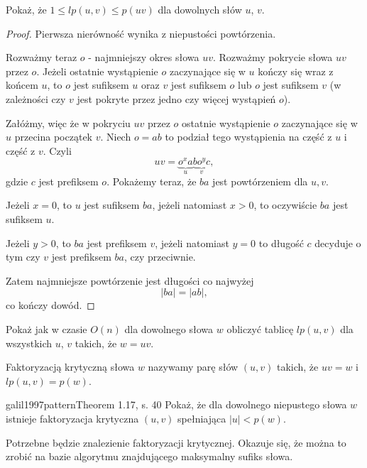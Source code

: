\begin{problem}{}{}
  Pokaż, że $1 \le lp(u, v) \le p(uv)$ dla dowolnych słów $u$, $v$.
\end{problem}

\begin{proof}
Pierwsza nierówność wynika z niepustości powtórzenia. 

Rozważmy teraz $o$ - najmniejszy okres słowa $uv$. Rozważmy pokrycie słowa $uv$ przez $o$. Jeżeli ostatnie wystąpienie $o$ zaczynające się w $u$ kończy się wraz z końcem $u$, to $o$ jest sufiksem $u$ oraz $v$ jest sufiksem $o$ lub $o$ jest sufiksem $v$ (w zależności czy $v$ jest pokryte przez jedno czy więcej wystąpień $o$).

Załóżmy, więc że w pokryciu $uv$ przez $o$ ostatnie wystąpienie $o$ zaczynające się w $u$ przecina początek $v$. Niech $o=ab$ to podział tego wystąpienia na część z $u$ i część z $v$. Czyli 
$$uv = \underbrace{o^{x} a}_{u} \underbrace{b o^{y} c}_{v},$$
gdzie $c$ jest prefiksem $o$.
Pokażemy teraz, że $ba$ jest powtórzeniem dla $u, v$.

Jeżeli $x=0$, to $u$ jest sufiksem $ba$, jeżeli natomiast $x>0$, to oczywiście $ba$ jest sufiksem $u$.
 
Jeżeli $y>0$, to $ba$ jest prefiksem $v$, jeżeli natomiast $y=0$ to długość $c$ decyduje o tym czy $v$ jest prefiksem $ba$, czy przeciwnie. 
 
Zatem najmniejsze powtórzenie jest długości co najwyżej 
$$|ba| = |ab|,$$
co kończy dowód.
\end{proof}

\begin{problem}{}{}
  Pokaż jak w czasie $O(n)$ dla dowolnego słowa $w$ obliczyć tablicę $lp(u, v)$ dla wszystkich $u$, $v$ takich, że $w = uv$.
\end{problem}

\begin{definition}{}{}
  Faktoryzacją krytyczną słowa $w$ nazywamy parę słów $(u, v)$ takich, że $uv = w$ i $lp(u, v) = p(w)$.
\end{definition}

\begin{problem}{galil1997pattern}{Theorem 1.17, s. 40}
  Pokaż, że dla dowolnego niepustego słowa $w$ istnieje faktoryzacja krytyczna $(u, v)$ spełniająca $|u| < p(w)$.
\end{problem}

Potrzebne będzie znalezienie faktoryzacji krytycznej. Okazuje się, że można to zrobić na bazie algorytmu znajdującego maksymalny sufiks słowa.

